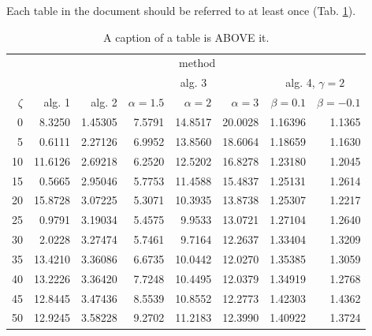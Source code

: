 \documentclass[a4paper,twoside,12pt]{book}
\begin{document}
Each table in the document should be referred to at least once (Tab. \ref{tab:results}).

\begin{table}
\centering
\caption{A caption of a table is ABOVE it.}
\label{tab:results}
\begin{tabular}{rrrrrrrr}
\toprule
	         &                                     \multicolumn{7}{c}{method}                                      \\
	         \cmidrule{2-8}
	         &         &         &        \multicolumn{3}{c}{alg. 3}        & \multicolumn{2}{c}{alg. 4, $\gamma = 2$} \\
	         \cmidrule(r){4-6}\cmidrule(r){7-8}
	$\zeta$ &     alg. 1 &   alg. 2 & $\alpha= 1.5$ & $\alpha= 2$ & $\alpha= 3$ &   $\beta = 0.1$  &   $\beta = -0.1$ \\
\midrule
	       0 &  8.3250 & 1.45305 &       7.5791 &    14.8517 &    20.0028 & 1.16396 &                       1.1365 \\
	       5 &  0.6111 & 2.27126 &       6.9952 &    13.8560 &    18.6064 & 1.18659 &                       1.1630 \\
	      10 & 11.6126 & 2.69218 &       6.2520 &    12.5202 &    16.8278 & 1.23180 &                       1.2045 \\
	      15 &  0.5665 & 2.95046 &       5.7753 &    11.4588 &    15.4837 & 1.25131 &                       1.2614 \\
	      20 & 15.8728 & 3.07225 &       5.3071 &    10.3935 &    13.8738 & 1.25307 &                       1.2217 \\
	      25 &  0.9791 & 3.19034 &       5.4575 &     9.9533 &    13.0721 & 1.27104 &                       1.2640 \\
	      30 &  2.0228 & 3.27474 &       5.7461 &     9.7164 &    12.2637 & 1.33404 &                       1.3209 \\
	      35 & 13.4210 & 3.36086 &       6.6735 &    10.0442 &    12.0270 & 1.35385 &                       1.3059 \\
	      40 & 13.2226 & 3.36420 &       7.7248 &    10.4495 &    12.0379 & 1.34919 &                       1.2768 \\
	      45 & 12.8445 & 3.47436 &       8.5539 &    10.8552 &    12.2773 & 1.42303 &                       1.4362 \\
	      50 & 12.9245 & 3.58228 &       9.2702 &    11.2183 &    12.3990 & 1.40922 &                       1.3724 \\
\bottomrule
\end{tabular}
\end{table}  
\end{document}
